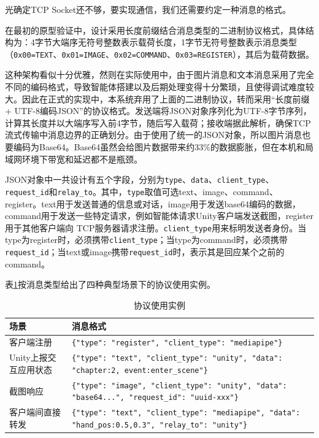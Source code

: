 \documentclass[bachelor]{njupthesis}
\begin{document}
光确定TCP Socket还不够，要实现通信，我们还需要约定一种消息的格式。

在最初的原型验证中，设计采用长度前缀结合消息类型的二进制协议格式，具体结构为：4字节大端序无符号整数表示载荷长度，1字节无符号整数表示消息类型（\texttt{0x00=TEXT}、\texttt{0x01=IMAGE}、\texttt{0x02=COMMAND}、\texttt{0x03=REGISTER}），其后为载荷数据。

这种架构看似十分优雅，然则在实际使用中，由于图片消息和文本消息采用了完全不同的编码格式，导致智能体搭建以及后期处理变得十分繁琐，且使得调试难度较大。因此在正式的实现中，本系统弃用了上面的二进制协议，转而采用“长度前缀 + UTF-8编码JSON”的协议格式。发送端将JSON对象序列化为UTF-8字节序列，计算其长度并以大端序写入前4字节，随后写入载荷；接收端据此解析，确保TCP流式传输中消息边界的正确划分。由于使用了统一的JSON对象，所以图片消息也要编码为Base64。Base64虽然会给图片数据带来约33\%的数据膨胀，但在本机和局域网环境下带宽和延迟都不是瓶颈。

JSON对象中一共设计有五个字段，分别为\texttt{type}、\texttt{data}、\texttt{client\_type}、\texttt{request\_id}和\texttt{relay\_to}。其中，\texttt{type}取值可选text、image、command、register。text用于发送普通的信息或对话，image用于发送base64编码的数据，command用于发送一些特定请求，例如智能体请求Unity客户端发送截图，register用于其他客户端向 TCP服务器请求注册。\texttt{client\_type}用来标明发送者身份。当type为register时，必须携带\texttt{client\_type}；当type为command时，必须携带\texttt{request\_id}；当text或image携带\texttt{request\_id}时，表示其是回应某个之前的command。

表\ref{tbl:protocol-examples}按消息类型给出了四种典型场景下的协议使用实例。

\begin{table}[h]
\centering
\caption{协议使用实例}
\begin{tabularx}{\linewidth}{lX}
\toprule
场景 & 消息格式 \\
\midrule
客户端注册 & \texttt{\{"type": "register", "client\_type": "mediapipe"\}} \\
Unity上报交互应用状态 & \texttt{\{"type": "text", "client\_type": "unity", "data": "chapter:2, event:enter\_scene"\}} \\
截图响应 & \texttt{\{"type": "image", "client\_type": "unity", "data": "base64...", "request\_id": "uuid-xxx"\}} \\
客户端间直接转发 & \texttt{\{"type": "text", "client\_type": "mediapipe", "data": "hand\_pos:0.5,0.3", "relay\_to": "unity"\}} \\
\bottomrule
\end{tabularx}
\label{tbl:protocol-examples}
\end{table}
\end{document}
